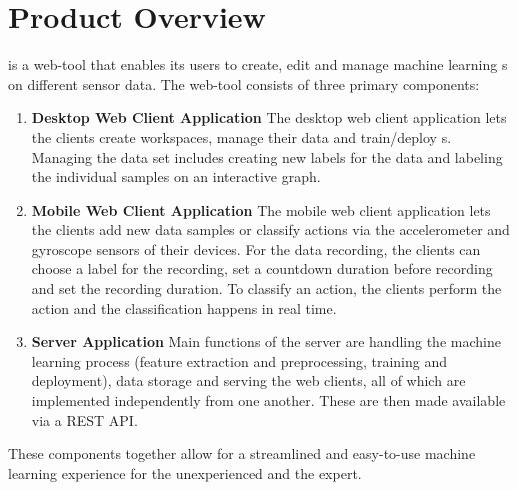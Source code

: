 \section{Product Overview}

 {\pseProjectName} is a web-tool that enables its users to create, edit and manage machine learning s on different \gls{sensor} data. The web-tool consists of three primary components:

\begin{enumerate}
    \item \textbf{Desktop Web Client Application}
    The desktop web client application lets the clients create workspaces, manage their data and train/deploy s. Managing the data set includes creating new labels for the data and labeling the individual samples on an interactive graph.

    \item \textbf{Mobile Web Client Application}
    The mobile web client application lets the clients add new data samples or classify actions via the \gls{accelerometer} and \gls{gyroscope} \glspl{sensor} of their devices. For the data recording, the clients can choose a label for the recording, set a countdown duration before recording and set the recording duration. To classify an action, the clients perform the action and the classification happens in real time.

    \item \textbf{Server Application}
     Main functions of the server are handling the machine learning process (\gls{feature extraction} and preprocessing,  training and deployment), data storage and serving the web clients, all of which are implemented independently from one another. These are then made available via a \gls{REST} API. 
     
\end{enumerate}

These components together allow for a streamlined and easy-to-use machine learning experience for the unexperienced and the expert.